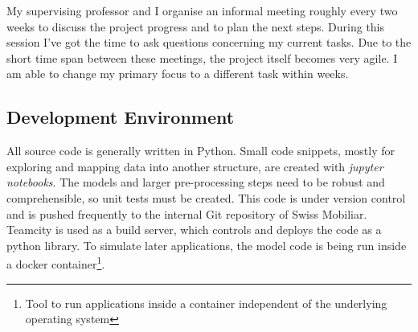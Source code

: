 My supervising professor and I organise an informal meeting roughly every two weeks to discuss the project progress and to plan the
next steps. During this session I've got the time to ask questions concerning my current tasks. Due to the short time span between
these meetings, the project itself becomes very agile. I am able to change my primary focus to a different task within weeks.

\subsection{Development Environment}

All source code is generally written in Python. Small code snippets, mostly for exploring and mapping data into another structure,
are created with \emph{jupyter notebooks}. The models and larger pre-processing steps need to be robust and comprehensible, so
unit tests must be created. This code is under version control and is pushed frequently to the internal Git repository of
Swiss Mobiliar. Teamcity is used as a build server, which controls and deploys the code as a python library. To simulate later
applications, the model code is being run inside a docker container\footnote{Tool to run applications inside a container independent
of the underlying operating system}.

